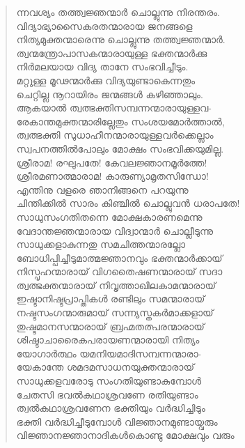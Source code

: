 \begin{verse}
ന്നവശ്യം തത്ത്വജ്ഞന്മാര്‍ ചൊല്ലുന്നു നിരന്തരം.\\
വിദ്യാഭ്യാസൈകരതന്മാരായ ജനങ്ങളെ\\
നിത്യമുക്തന്മാരെന്നു ചൊല്ലുന്നു തത്ത്വജ്ഞന്മാര്‍.\\
ത്വന്മന്ത്രോപാസകന്മാരായുള്ള ഭക്തന്മാര്‍ക്കു\\
നിര്‍മലയായ വിദ്യ താനേ സംഭവിച്ചീടും.\\
മറ്റുള്ള മൂഢന്മാര്‍ക്കു വിദ്യയുണ്ടാകെന്നതും\\
ചെറ്റില്ല നൂറായിരം ജന്മങ്ങള്‍ കഴിഞ്ഞാലും.\\
ആകയാല്‍ ത്വത്ഭക്തിസമ്പന്നന്മാരായുള്ളവ-\\
രേകാന്തമുക്തന്മാരില്ലേതും സംശയമോര്‍ത്താല്‍,\\
ത്വത്ഭക്തി സുധാഹീനന്മാരായുള്ളവര്‍ക്കെല്ലാം\\
സ്വപനത്തില്‍പോലും മോക്ഷം സംഭവിക്കയുമില്ല.\\
ശ്രീരാമ! രഘുപതേ! കേവലജ്ഞാനമൂര്‍ത്തേ!\\
ശ്രീരമണാത്മാരാമ! കാരുണ്യാമൃതസിന്ധോ!\\
എന്തിനു വളരെ ഞാനിങ്ങനെ പറയുന്നു\\
ചിന്തിക്കില്‍ സാരം കിഞ്ചില്‍ ചൊല്ലുവന്‍ ധരാപതേ!\\
സാധുസംഗതിതന്നെ മോക്ഷകാരണമെന്നു\\
വേദാന്തജ്ഞന്മാരായ വിദ്വാന്മാര്‍ ചൊല്ലീടുന്നു\\
സാധുക്കളാകുന്നതു സമചിത്തന്മാരല്ലോ\\
ബോധിപ്പിച്ചീടുമാത്മജ്ഞാനവും ഭക്തന്മാര്‍ക്കായ്\\
നിസ്പൃഹന്മാരായ് വിഗതൈഷണന്മാരായ് സദാ\\
ത്വത്ഭക്തന്മാരായ് നിവൃത്താഖിലകാമന്മാരായ്\\
ഇഷ്ടാനിഷ്ടപ്രാപ്തികള്‍ രണ്ടിലും സമന്മാരായ്\\
നഷ്ടസംഗന്മാരുമായ് സന്ന്യസ്തകര്‍മാക്കളായ്\\
തുഷ്ടമാനസന്മാരായ് ബ്രഹ്മതത്പരന്മാരായ്\\
ശിഷ്ടാചാരൈകപരായണന്മാരായി നിത്യം\\
യോഗാര്‍ത്ഥം യമനിയമാദിസമ്പന്നന്മാരാ-\\
യേകാന്തേ ശമദമസാധനയുക്തന്മാരായ്\\
സാധുക്കളവരോടു സംഗതിയുണ്ടാകുമ്പോള്‍\\
ചേതസി ഭവല്‍കഥാശ്രവണേ രതിയുണ്ടാം\\
ത്വല്‍കഥാശ്രവണേന ഭക്തിയും വര്‍ദ്ധിച്ചിടും\\
ഭക്തി വര്‍ദ്ധിച്ചീടുമ്പോള്‍ വിജ്ഞാനമുണ്ടായ്വരും\\
വിജ്ഞാനജ്ഞാനാദികള്‍കൊണ്ടു മോക്ഷവും വരും\\

\end{verse}
